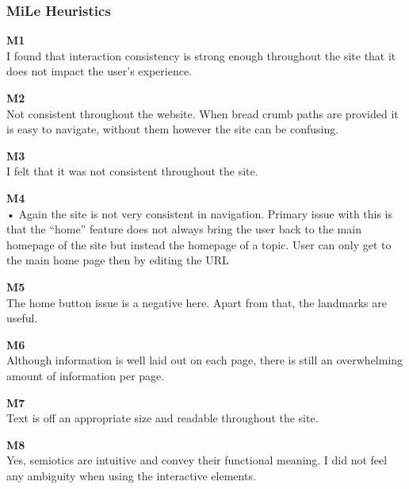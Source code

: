 \subsubsection{MiLe Heuristics}
\begin{description}
    \item {\textbf{M1} \color{unicefGray}{Interaction consistency}}\\
    I found that interaction consistency is strong enough throughout the site that it does not impact the user’s experience. 
    \item {\textbf{M2} \color{unicefGray}{Group navigation}}\\
    Not consistent throughout the website. When bread crumb paths are provided it is easy to navigate, without them however the site can be confusing. 
    \item {\textbf{M3} \color{unicefGray}{Structural Navigation}}\\
    I felt that it was not consistent throughout the site. 
    \item {\textbf{M4} \color{unicefGray}{Semantic Navigation}}\\
    •	Again the site is not very consistent in navigation. Primary issue with this is that the “home” feature does not always bring the user back to the main homepage of the site but instead the homepage of a topic. User can only get to the main home page then by editing the URL
    \item {\textbf{M5} \color{unicefGray}{landmarks}}\\
    The home button issue is a negative here. Apart from that, the landmarks are useful.
    \item {\textbf{M6} \color{unicefGray}{Information overload}}\\
    Although information is well laid out on each page, there is still an overwhelming amount of information per page. 
    \item {\textbf{M7} \color{unicefGray}{Text layout}}\\
    Text is off an appropriate size and readable throughout the site.
    \item {\textbf{M8} \color{unicefGray}{Interaction placeholder semiotics}}\\
    Yes, semiotics are intuitive and convey their functional meaning. I did not feel any ambiguity when using the interactive elements.
    \begin{figure}[htp!]
        \centering

\end{figure}
\end{description}
